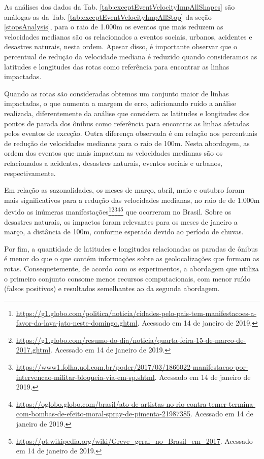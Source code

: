 \documentclass[
	12pt,				%
	oneside,			%
	a4paper,			%
	english,			%
	brazil				%
	]{abntex2ppgsi}
\begin{document}
{{As análises dos dados da Tab. \ref{tab:exceptEventVelocityImpAllShapes} são análogas as da Tab. \ref{tab:exceptEventVelocityImpAllStop} da seção \ref{stopsAnalysis}, para o raio de 1.000m os eventos que mais reduzem as velocidades medianas são os relacionados a eventos sociais, urbanos, acidentes e desastres naturais, nesta ordem. Apesar disso, é importante observar que o percentual de redução da velocidade mediana é reduzido quando consideramos as latitudes e longitudes das rotas como referência para encontrar as linhas impactadas. 

Quando as rotas são consideradas obtemos um conjunto maior de linhas impactadas, o que aumenta a margem de erro, adicionando ruído a análise realizada, diferentemente da análise que considera as latitudes e longitudes dos pontos de parada dos ônibus como referência para encontras as linhas afetadas pelos eventos de exceção. Outra diferença observada é em relação aos percentuais de redução de velocidades medianas para o raio de 100m. Nesta abordagem, as ordem dos eventos que mais impactam as velocidades medianas são os relacionados a acidentes, desastres naturais, eventos sociais e urbanos, respectivamente.

Em relação as sazonalidades, os meses de  março, abril, maio e outubro foram mais significativos para a redução das velocidades medianas, no raio de de 1.000m devido as inúmeras manifestações\footnote{\url{https://g1.globo.com/politica/noticia/cidades-pelo-pais-tem-manifestacoes-a-favor-da-lava-jato-neste-domingo.ghtml}. Acessado em 14 de janeiro de 2019.}\footnote{\url{https://g1.globo.com/resumo-do-dia/noticia/quarta-feira-15-de-marco-de-2017.ghtml}. Acessado em 14 de janeiro de 2019.}\footnote{\url{https://www1.folha.uol.com.br/poder/2017/03/1866022-manifestacao-por-intervencao-militar-bloqueia-via-em-sp.shtml}. Acessado em 14 de janeiro de 2019.}\footnote{\url{https://oglobo.globo.com/brasil/ato-de-artistas-no-rio-contra-temer-termina-com-bombas-de-efeito-moral-spray-de-pimenta-21987385}. Acessado em 14 de janeiro de 2019.}\footnote{\url{https://pt.wikipedia.org/wiki/Greve\_geral\_no\_Brasil\_em\_2017}. Acessado em 14 de janeiro de 2019.} que ocorreram no Brasil. Sobre os desastres naturais, os impactos foram relevantes para os meses de janeiro a março, a distância de 100m, conforme esperado devido ao período de chuvas.

Por fim, a quantidade de latitudes e longitudes relacionadas as paradas de ônibus é menor do que o que contém informações sobre as geolocalizações que formam as rotas. Consequetemente, de acordo com os experimentos, a abordagem que utiliza o primeiro conjunto consome menos recursos computacionais, com menor ruído (falsos positivos) e resultados semelhantes ao da segunda abordagem.

}}
\end{document}
